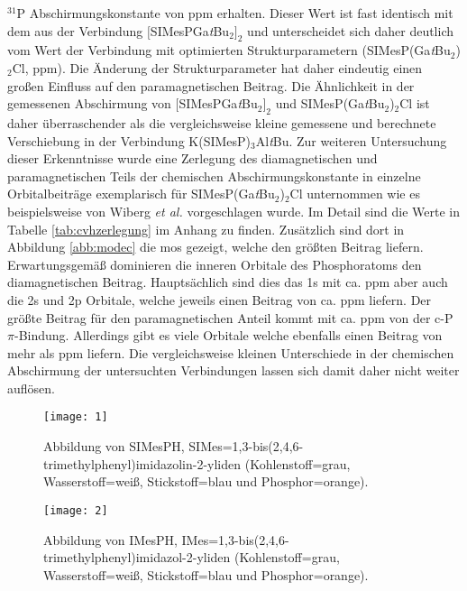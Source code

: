 $^{31}$P Abschirmungskonstante von \unit[336]{ppm} erhalten. Dieser Wert ist fast identisch mit dem aus der Verbindung $[$SIMesPGa\textit{t}Bu$_2]_2$ und unterscheidet sich daher deutlich vom Wert der Verbindung mit optimierten Strukturparametern (SIMesP(Ga\textit{t}Bu$_2$)$_2$Cl, \unit[380]{ppm}). Die Änderung der Strukturparameter hat daher eindeutig einen großen Einfluss auf den paramagnetischen Beitrag. Die Ähnlichkeit in der gemessenen Abschirmung von $[$SIMesPGa\textit{t}Bu$_2]_2$ und SIMesP(Ga\textit{t}Bu$_2$)$_2$Cl ist daher überraschender als die vergleichsweise kleine gemessene und berechnete Verschiebung in der Verbindung K(SIMesP)$_3$Al\textit{t}Bu.
Zur weiteren Untersuchung dieser Erkenntnisse wurde eine Zerlegung des diamagnetischen und paramagnetischen Teils der chemischen Abschirmungskonstante in einzelne Orbitalbeiträge exemplarisch für SIMesP(Ga\textit{t}Bu$_2$)$_2$Cl unternommen wie es beispielsweise von Wiberg \textit{et al.}\supercite{wiberg1998nmr} vorgeschlagen wurde. Im Detail sind die Werte in Tabelle \ref{tab:cvhzerlegung} im Anhang zu finden. Zusätzlich sind dort in Abbildung \ref{abb:modec} die \acp{mo} gezeigt, welche den größten Beitrag liefern. Erwartungsgemäß dominieren die inneren Orbitale des Phosphoratoms den diamagnetischen Beitrag. Hauptsächlich sind dies das 1s mit ca. \unit[500]{ppm} aber auch die 2s und 2p Orbitale, welche jeweils einen Beitrag von ca. \unit[100]{ppm} liefern. Der größte Beitrag für den paramagnetischen Anteil kommt mit ca. \unit[-180]{ppm} von der c-P $\pi$-Bindung. Allerdings gibt es viele Orbitale welche ebenfalls einen Beitrag von mehr als \unit[10]{ppm} liefern. Die vergleichsweise kleinen Unterschiede in der chemischen Abschirmung der untersuchten Verbindungen lassen sich damit daher nicht weiter auflösen.

\begin{figure}[ht!]
	\centering
	\texttt{[image: 1]}
	\captionsetup{figurewithin = chapter}
	\captionsetup{font=small, labelfont=bf}\caption[Abbildung von SIMesPH]{Abbildung von SIMesPH, SIMes=1,3-bis(2,4,6-tri\-me\-thyl\-phe\-nyl)imi\-da\-zo\-lin-2-yli\-den (Kohlenstoff=grau, Wasserstoff=weiß, Stickstoff=blau und Phosphor=orange).}
\label{abb:cvh1}
\end{figure}

\begin{figure}[ht!]
	\centering
	\texttt{[image: 2]}
	\captionsetup{figurewithin = chapter}
	\captionsetup{font=small, labelfont=bf}\caption[Abbildung von IMesPH]{Abbildung von IMesPH, IMes=1,3-bis(2,4,6-tri\-me\-thyl\-phe\-nyl)imi\-da\-zol-2-yli\-den (Kohlenstoff=grau, Wasserstoff=weiß, Stickstoff=blau und Phosphor=orange).}
\label{abb:cvh2}
\end{figure}

